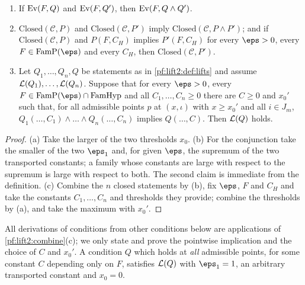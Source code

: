 \begin{lemma}\label{pf:lift2:combine}
\begin{enumerate}[label=(\alph*)]
\item If $\operatorname{Ev}(F,Q)$ and $\operatorname{Ev}(F,Q')$, then $\operatorname{Ev}(F,Q\wedge Q')$.
\item $\mathrm{Closed}(\mathcal C,P)$ and $\mathrm{Closed}(\mathcal C,P')$ imply $\mathrm{Closed}(\mathcal C,P\wedge P')$;
and if $\mathrm{Closed}(\mathcal C,P)$ and $P(F,C_H)$ implies $P'(F,C_H)$ for every $\eps>0$, every
$F\in\mathrm{FamP}(\eps)$ and every $C_H$, then $\mathrm{Closed}(\mathcal C,P')$.
\item Let $Q_1,\dots,Q_n,Q$ be statements as in \cref{pf:lift2:def:lifts} and assume $\mathcal{L}(Q_1),\dots,
\mathcal{L}(Q_n)$. Suppose that for every $\eps>0$, every $F\in\mathrm{FamP}(\eps)\cap\mathrm{FamHyp}$ and all
$C_1,\dots,C_n\ge0$ there are $C\ge0$ and $x_0'$ such that, for all admissible points $p$ at $(x,\iota)$ with
$x\ge x_0'$ and all $i\in J_m$, $Q_1(\dots,C_1)\wedge\dots\wedge Q_n(\dots,C_n)$ implies $Q(\dots,C)$. Then
$\mathcal{L}(Q)$ holds.
\end{enumerate}
\end{lemma}

\begin{proof}
(a) Take the larger of the two thresholds $x_0$. (b) For the conjunction take the smaller of the two
$\eps_1$ and, for given $\eps$, the supremum of the two transported constants; a family whose constants are
large with respect to the supremum is large with respect to both. The second claim is immediate from the
definition. (c) Combine the $n$ closed statements by (b), fix $\eps$, $F$ and $C_H$ and
take the constants $C_1,\dots,C_n$ and thresholds they provide; combine the thresholds by (a), and take the
maximum with $x_0'$.
\end{proof}

All derivations of conditions from other conditions below are applications of
\cref{pf:lift2:combine}(c); we only state and prove the pointwise implication and the choice of $C$ and
$x_0'$. A condition $Q$ which holds at \emph{all} admissible points, for some constant $C$ depending only on
$F$, satisfies $\mathcal{L}(Q)$ with $\eps_1=1$, an arbitrary transported constant and $x_0=0$.

